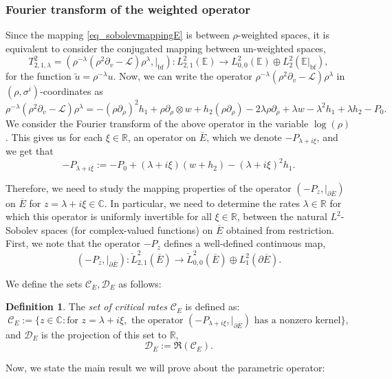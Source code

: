 \documentclass[10pt, a4paper]{article}
\theoremstyle{plain}%
\theoremstyle{definition}
\newtheorem{defn}[theorem]{Definition}
\numberwithin{figure}{section}
\numberwithin{equation}{section}
\newcommand{\bR}{\mathbb{R}}
\newcommand{\bC}{\mathbb{C}}
\newcommand{\bE}{\mathbb{E}}
\newcommand{\pa}{\partial}
\newcommand{\rt}{\rightarrow}
\newcommand{\tu}{\tilde{u}}
\newcommand{\cL}{\mathcal{L}}
\newcommand{\oE}{{\overline{E}}}
\newcommand{\botf}{\textrm{bf}}
\newcommand{\cC}{\mathcal{C}}
\newcommand{\cD}{\mathcal{D}}
\begin{document}
\subsubsection{Fourier transform of the weighted operator}

 Since the mapping \eqref{eq_sobolevmappingE} is between $\rho$-weighted spaces, it is equivalent to consider the conjugated mapping between un-weighted spaces,
\[
	T^2_{2,1,\lambda} = (\rho^{-\lambda}(\rho^2\pa_v-\cL)\rho^\lambda, |_{\botf}):L^2_{2,1}(\bE)\rt L^2_{0,0}(\bE)\oplus L^2_{2}(\bE|_{\textrm{bf}}),
\]
for the function $\tu = \rho^{-\lambda }u$. Now, we can write the operator $\rho^{-\lambda}(\rho^2\pa_v-\cL)\rho^\lambda$ in $(\rho,\sigma^i)$-coordinates as\[
\rho^{-\lambda}(\rho^2\pa_v-\cL)\rho^{\lambda} = -(\rho\pa_\rho)^2h_1+\rho\pa_\rho\otimes w+ h_2(\rho\pa_\rho)  - 2\lambda \rho\pa_\rho + \lambda w - \lambda^2h_1 +\lambda h_2 -P_0.
\]
 We consider the Fourier transform of the above operator in the variable $\log(\rho)$. This gives us for each $\xi\in \bR$, an operator on $\oE$, which we denote $-P_{\lambda+i\xi}$, and we get that \[
 -P_{\lambda+i\xi}:= -P_0 + (\lambda+i\xi) (w  +h_2) -(\lambda+i\xi)^2h_1.
 \]

Therefore, we need to study the mapping properties of the operator $(-P_z,|_{\pa\oE})$ on $\oE$ for $z = \lambda +i \xi\in \bC$. In particular, we need to determine the rates $\lambda\in\bR$ for which this operator is uniformly invertible for all $\xi \in \bR$, between the natural $L^2$-Sobolev spaces (for complex-valued functions) on $\oE$ obtained from restriction. First, we note that the operator $-P_z$ defines a well-defined continuous map, 
	\begin{equation}\label{eq_mappingsobolevff2}
		(-P_z,|_{\pa\oE}) : \check{L}^2_{2,1}(\oE) \rt \check{L}^2_{0,0}(\oE)\oplus L^2_{1}(\pa\oE).
	\end{equation}

We define the sets $\cC_E,\cD_E$ as follows:

\begin{defn}
	The \textit{set of critical rates} $\cC_E$ is defined as:
	\[
	\cC_E:=\{ z\in \bC : \textrm{for } z= \lambda+i\xi, \textrm{ the operator } (-P_{\lambda+i\xi}, |_{\pa\oE})  \textrm{ has a nonzero kernel}\},
	\]
	and $\cD_E$ is the projection of this set to $\bR$,\[
	\cD_E:= \Re(\cC_E).
	\]
\end{defn}

Now, we state the main result we will prove about the parametric operator:
\end{document}
